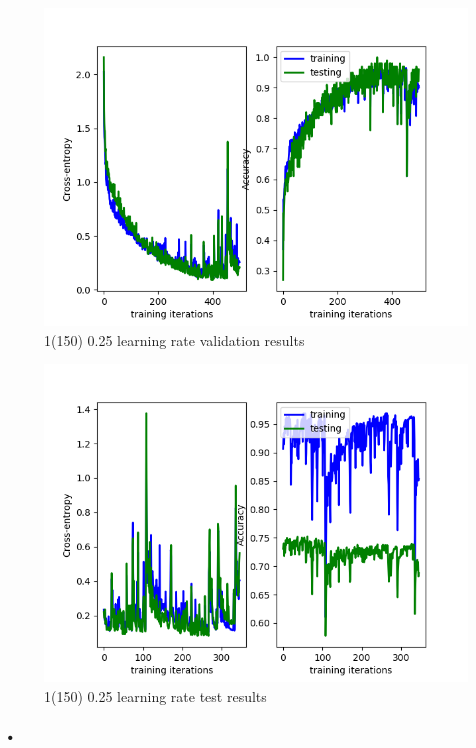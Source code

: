 \documentclass[a4paper]{report}
\begin{document}
\begin{figure}[h]
\begin{center}
\includegraphics[scale=0.5]{150025.png}
\end{center}
\caption{1(150) 0.25 learning rate validation results}
\end{figure}
\begin{figure}[h]
\begin{center}
\includegraphics[scale=0.5]{150025test.png}
\end{center}
\caption{1(150) 0.25 learning rate test results}
\end{figure}

\paragraph{•}
\end{document}
